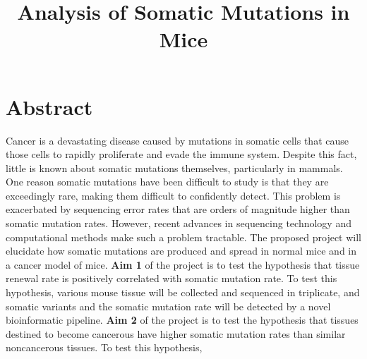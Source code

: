 \documentclass[12pt]{article}
\title{Analysis of Somatic Mutations in Mice}
\date{}
\begin{document}
\maketitle





\section{Abstract}

Cancer is a devastating disease caused by mutations in somatic cells that cause those cells to rapidly proliferate and evade the immune system.
Despite this fact, little is known about somatic mutations themselves, particularly in mammals.
One reason somatic mutations have been difficult to study is that they are exceedingly rare, making them difficult to confidently detect.
This problem is exacerbated by sequencing error rates that are orders of magnitude higher than somatic mutation rates.
However, recent advances in sequencing technology and computational methods make such a problem tractable.
The proposed project will elucidate how somatic mutations are produced and spread in normal mice and in a cancer model of mice.
\textbf{Aim 1} of the project is to test the hypothesis that tissue renewal rate is positively correlated with somatic mutation rate.
To test this hypothesis, various mouse tissue will be collected and sequenced in triplicate, and somatic variants and the somatic mutation rate will be detected by a novel bioinformatic pipeline. 
\textbf{Aim 2} of the project is to test the hypothesis that tissues destined to become cancerous have higher somatic mutation rates than similar noncancerous tissues.
To test this hypothesis, 
\end{document}
